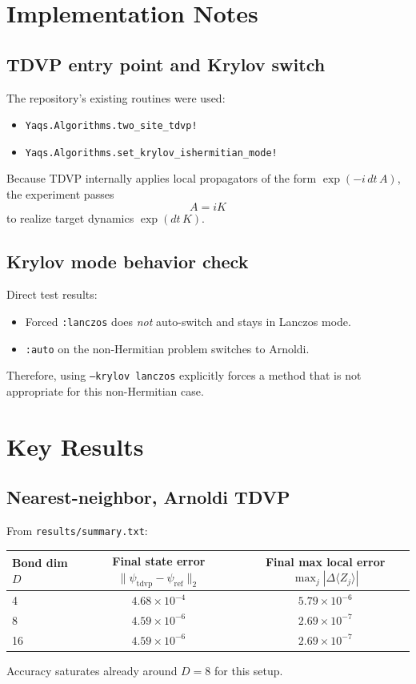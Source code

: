 \documentclass[11pt]{article}
\begin{document}
\section{Implementation Notes}
\subsection{TDVP entry point and Krylov switch}
The repository's existing routines were used:
\begin{itemize}
  \item \texttt{Yaqs.Algorithms.two\_site\_tdvp!}
  \item \texttt{Yaqs.Algorithms.set\_krylov\_ishermitian\_mode!}
\end{itemize}

Because TDVP internally applies local propagators of the form \(\exp(-i\,dt\,A)\), the experiment passes
\[
A=iK
\]
to realize target dynamics \(\exp(dt\,K)\).

\subsection{Krylov mode behavior check}
Direct test results:
\begin{itemize}
  \item Forced \texttt{:lanczos} does \emph{not} auto-switch and stays in Lanczos mode.
  \item \texttt{:auto} on the non-Hermitian problem switches to Arnoldi.
\end{itemize}
Therefore, using \texttt{--krylov lanczos} explicitly forces a method that is not appropriate for this non-Hermitian case.

\section{Key Results}
\subsection{Nearest-neighbor, Arnoldi TDVP}
From \texttt{results/summary.txt}:
\begin{center}
\begin{tabular}{@{}lcc@{}}
\toprule
Bond dim \(D\) & Final state error \(\|\psi_{\mathrm{tdvp}}-\psi_{\mathrm{ref}}\|_2\) & Final max local error \(\max_j|\Delta\langle Z_j\rangle|\) \\
\midrule
4  & \(4.68\times 10^{-4}\) & \(5.79\times 10^{-6}\) \\
8  & \(4.59\times 10^{-6}\) & \(2.69\times 10^{-7}\) \\
16 & \(4.59\times 10^{-6}\) & \(2.69\times 10^{-7}\) \\
\bottomrule
\end{tabular}
\end{center}
Accuracy saturates already around \(D=8\) for this setup.
\end{document}
